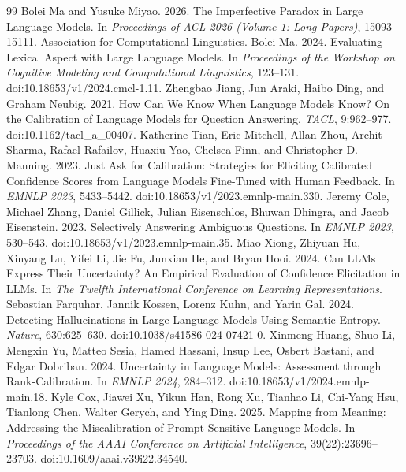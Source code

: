 \begin{thebibliography}{99}
 Bolei Ma and Yusuke Miyao. 2026. The Imperfective Paradox in Large Language Models. In \emph{Proceedings of ACL 2026 (Volume 1: Long Papers)}, 15093--15111. Association for Computational Linguistics.
 Bolei Ma. 2024. Evaluating Lexical Aspect with Large Language Models. In \emph{Proceedings of the Workshop on Cognitive Modeling and Computational Linguistics}, 123--131. doi:10.18653/v1/2024.cmcl-1.11.
 Zhengbao Jiang, Jun Araki, Haibo Ding, and Graham Neubig. 2021. How Can We Know When Language Models Know? On the Calibration of Language Models for Question Answering. \emph{TACL}, 9:962--977. doi:10.1162/tacl\_a\_00407.
 Katherine Tian, Eric Mitchell, Allan Zhou, Archit Sharma, Rafael Rafailov, Huaxiu Yao, Chelsea Finn, and Christopher D. Manning. 2023. Just Ask for Calibration: Strategies for Eliciting Calibrated Confidence Scores from Language Models Fine-Tuned with Human Feedback. In \emph{EMNLP 2023}, 5433--5442. doi:10.18653/v1/2023.emnlp-main.330.
 Jeremy Cole, Michael Zhang, Daniel Gillick, Julian Eisenschlos, Bhuwan Dhingra, and Jacob Eisenstein. 2023. Selectively Answering Ambiguous Questions. In \emph{EMNLP 2023}, 530--543. doi:10.18653/v1/2023.emnlp-main.35.
 Miao Xiong, Zhiyuan Hu, Xinyang Lu, Yifei Li, Jie Fu, Junxian He, and Bryan Hooi. 2024. Can LLMs Express Their Uncertainty? An Empirical Evaluation of Confidence Elicitation in LLMs. In \emph{The Twelfth International Conference on Learning Representations}.
 Sebastian Farquhar, Jannik Kossen, Lorenz Kuhn, and Yarin Gal. 2024. Detecting Hallucinations in Large Language Models Using Semantic Entropy. \emph{Nature}, 630:625--630. doi:10.1038/s41586-024-07421-0.
 Xinmeng Huang, Shuo Li, Mengxin Yu, Matteo Sesia, Hamed Hassani, Insup Lee, Osbert Bastani, and Edgar Dobriban. 2024. Uncertainty in Language Models: Assessment through Rank-Calibration. In \emph{EMNLP 2024}, 284--312. doi:10.18653/v1/2024.emnlp-main.18.
 Kyle Cox, Jiawei Xu, Yikun Han, Rong Xu, Tianhao Li, Chi-Yang Hsu, Tianlong Chen, Walter Gerych, and Ying Ding. 2025. Mapping from Meaning: Addressing the Miscalibration of Prompt-Sensitive Language Models. In \emph{Proceedings of the AAAI Conference on Artificial Intelligence}, 39(22):23696--23703. doi:10.1609/aaai.v39i22.34540.

\end{thebibliography}
